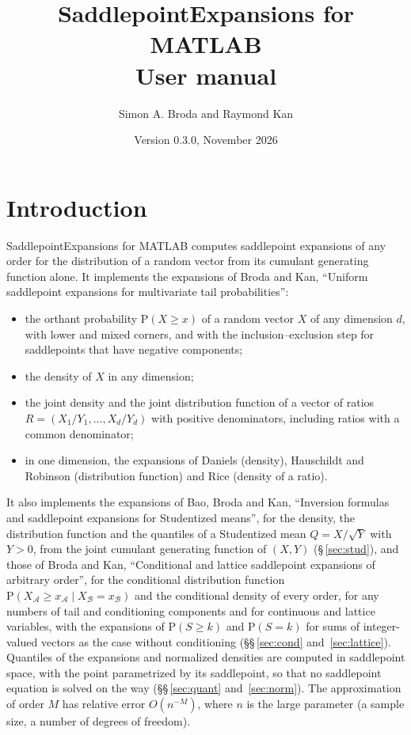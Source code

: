 \documentclass[11pt]{article}
\title{SaddlepointExpansions for MATLAB\\[4pt]
\large User manual}
\author{Simon A. Broda and Raymond Kan}
\date{Version 0.3.0, November 2026}
\newcommand{\pr}{\mathrm{P}}
\begin{document}
\sloppy
\maketitle

\tableofcontents

\section{Introduction}

SaddlepointExpansions for MATLAB computes saddlepoint expansions of any order for the
distribution of a random vector from its cumulant generating function alone. It implements the
expansions of Broda and Kan, ``Uniform saddlepoint expansions for multivariate tail
probabilities'':
\begin{itemize}
\item the orthant probability $\pr(X\geq x)$ of a random vector $X$ of any dimension $d$, with lower
and mixed corners, and with the inclusion--exclusion step for saddlepoints that have negative
components;
\item the density of $X$ in any dimension;
\item the joint density and the joint distribution function of a vector of ratios
$R=(X_1/Y_1,\ldots,X_d/Y_d)$ with positive denominators, including ratios with a common
denominator;
\item in one dimension, the expansions of Daniels (density), Hauschildt and Robinson (distribution
function) and Rice (density of a ratio).
\end{itemize}
It also implements the expansions of Bao, Broda and Kan, ``Inversion formulas and saddlepoint
expansions for Studentized means'', for the density, the distribution function and the quantiles of
a Studentized mean $Q=X/\sqrt{Y}$ with $Y>0$, from the joint cumulant generating function of
$(X,Y)$ (\S\,\ref{sec:stud}), and those of Broda and Kan, ``Conditional and lattice saddlepoint
expansions of arbitrary order'', for the conditional distribution function
$\pr(X_{\mathcal A}\geq x_{\mathcal A}\mid X_{\mathcal B}=x_{\mathcal B})$ and the conditional density
of every order, for any numbers of tail and conditioning components and for continuous and lattice
variables, with the expansions of $\pr(S\geq k)$ and $\pr(S=k)$ for sums of integer-valued vectors as
the case without conditioning (\S\S\,\ref{sec:cond} and~\ref{sec:lattice}). Quantiles of the
expansions and normalized densities are computed in saddlepoint space, with the point
parametrized by its saddlepoint, so that no saddlepoint equation is solved on the way
(\S\S\,\ref{sec:quant} and~\ref{sec:norm}).
The approximation of order $M$ has relative error $O(n^{-M})$, where $n$ is the large parameter (a
sample size, a number of degrees of freedom).
\end{document}
